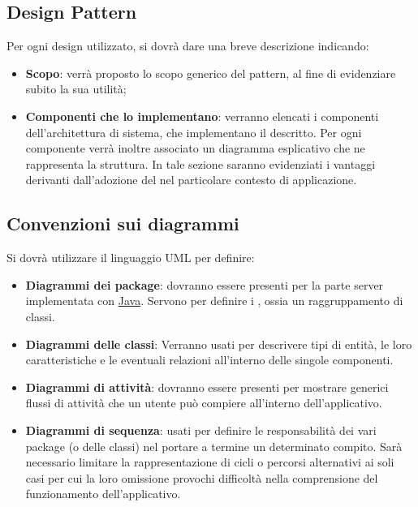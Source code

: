 {\subsection{Design Pattern}
\label{sec:design_patterns}
Per ogni design  utilizzato, si dovrà dare una breve descrizione indicando:
\begin{itemize}
\item \textbf{Scopo}: verrà proposto lo scopo generico del pattern, al fine di evidenziare subito la sua utilità;
\item \textbf{Componenti che lo implementano}: verranno elencati i componenti dell'architettura di sistema, che implementano il  descritto. Per ogni componente verrà inoltre associato un diagramma esplicativo che ne rappresenta la struttura. In tale sezione saranno evidenziati i vantaggi derivanti dall'adozione del  nel particolare contesto di applicazione.
\end{itemize}

\subsection{Convenzioni sui diagrammi}
Si dovrà utilizzare il linguaggio UML per definire:
\begin{itemize}

\item \textbf{Diagrammi dei package}: dovranno essere presenti per la parte server implementata con \underline{Java}. Servono per definire i , ossia un raggruppamento di classi.

\item \textbf{Diagrammi delle classi}: Verranno usati per descrivere tipi di entità, le loro caratteristiche e le eventuali relazioni all'interno delle singole componenti.

\item \textbf{Diagrammi di attività}: dovranno essere presenti per mostrare generici flussi di attività che un utente può compiere all'interno dell'applicativo.

\item \textbf{Diagrammi di sequenza}: usati per definire le responsabilità dei vari package (o delle classi) nel portare a termine un determinato compito. Sarà necessario limitare la rappresentazione di cicli o percorsi alternativi ai soli casi per cui la loro omissione provochi difficoltà nella comprensione del funzionamento dell'applicativo. 
\end{itemize}

}
